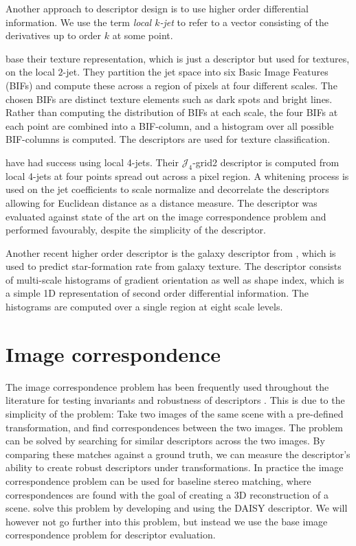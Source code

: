\documentclass[thesis.tex]{subfiles}
\begin{document}
Another approach to descriptor design is to use higher order differential information. We use the term \emph{local $k$-jet} to refer to a vector consisting of the derivatives up to order $k$ at some point.

\citet{crosier2010using} base their texture representation, which is just a descriptor but used for textures, on the local $2$-jet. They partition the jet space into six Basic Image Features (BIFs) and compute these across a region of pixels at four different scales. The chosen BIFs are distinct texture elements such as dark spots and bright lines. Rather than computing the distribution of BIFs at each scale, the four BIFs at each point are combined into a BIF-column, and a histogram over all possible BIF-columns is computed. The descriptors are used for texture classification.

\citet{larsen2012jet} have had success using local 4-jets. Their $\mathcal{J}_4$-grid2 descriptor is computed from local 4-jets at four points spread out across a pixel region. A whitening process is used on the jet coefficients to scale normalize and decorrelate the descriptors allowing for Euclidean distance as a distance measure. The descriptor was evaluated against state of the art on the image correspondence problem and performed favourably, despite the simplicity of the descriptor.

Another recent higher order descriptor is the galaxy descriptor from \citet{pedersen2013shape}, which is used to predict star-formation rate from galaxy texture. The descriptor consists of multi-scale histograms of gradient orientation as well as shape index, which is a simple 1D representation of second order differential information. The histograms are computed over a single region at eight scale levels.
%
\section{Image correspondence}
%
The image correspondence problem has been frequently used throughout the literature for testing invariants and robustness of descriptors \cite{lowe2004distinctive,mikolajczyk2005performance,ke2004pca,larsen2012jet,cui2009scale,toews2009sift}. This is due to the simplicity of the problem: Take two images of the same scene with a pre-defined transformation, and find correspondences between the two images. The problem can be solved by searching for similar descriptors across the two images. By comparing these matches against a ground truth, we can measure the descriptor's ability to create robust descriptors under transformations. In practice the image correspondence problem can be used for baseline stereo matching, where correspondences are found with the goal of creating a 3D reconstruction of a scene. \citet{tola2008fast} solve this problem by developing and using the DAISY descriptor. We will however not go further into this problem, but instead we use the base image correspondence problem for descriptor evaluation.
\end{document}
